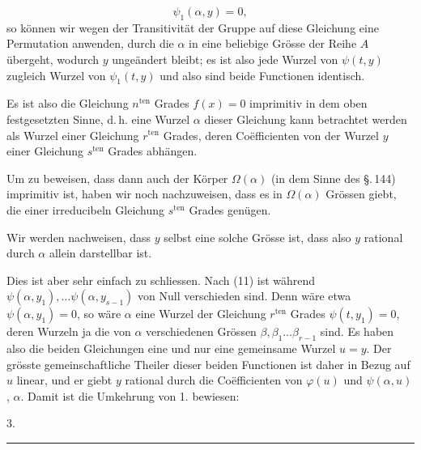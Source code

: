 \[
\psi_1(\alpha, y) = 0,
\]
so können wir wegen der Transitivität der Gruppe auf diese Gleichung eine Permutation anwenden, durch die $\alpha$ in eine beliebige Grösse der Reihe $A$ übergeht, wodurch $y$ ungeändert bleibt; es ist also jede Wurzel von $\psi(t, y)$ zugleich Wurzel von $\psi_1(t, y)$ und also sind beide Functionen identisch.

Es ist also die Gleichung $n^{\text{ten}}$ Grades $f(x) = 0$ imprimitiv in dem oben festgesetzten Sinne, d.\,h. eine Wurzel $\alpha$ dieser Gleichung kann betrachtet werden als Wurzel einer Gleichung $r^{\text{ten}}$ Grades, deren Coëfficienten von der Wurzel $y$ einer Gleichung $s^{\text{ten}}$ Grades abhängen.

Um zu beweisen, dass dann auch der Körper $\Omega(\alpha)$ (in dem Sinne des \S.\,144) imprimitiv ist, haben wir noch nachzuweisen, dass es in $\Omega(\alpha)$ Grössen giebt, die einer irreducibeln Gleichung $s^{\text{ten}}$ Grades genügen.

Wir werden nachweisen, dass $y$ selbst eine solche Grösse ist, dass also $y$ rational durch $\alpha$ allein darstellbar ist.

Dies ist aber sehr einfach zu schliessen. Nach (11) ist
während $\psi(\alpha, y_1), \ldots \psi(\alpha, y_{s-1})$ von Null verschieden sind. Denn wäre etwa $\psi(\alpha, y_1) = 0$, so wäre $\alpha$ eine Wurzel der Gleichung $r^{\text{ten}}$ Grades $\psi(t, y_1) = 0$, deren Wurzeln ja die von $\alpha$ verschiedenen Grössen $\beta, \beta_1 \ldots \beta_{r-1}$ sind. Es haben also die beiden Gleichungen
eine und nur eine gemeinsame Wurzel $u = y$. Der grösste gemeinschaftliche Theiler dieser beiden Functionen ist daher in Bezug auf $u$ linear, und er giebt $y$ rational durch die Coëfficienten von $\varphi(u)$ und $\psi(\alpha, u)$,  $\alpha$. Damit ist die Umkehrung von 1. bewiesen:

3. 

\begin{center}
\rule{3cm}{0.4pt}
\end{center}

